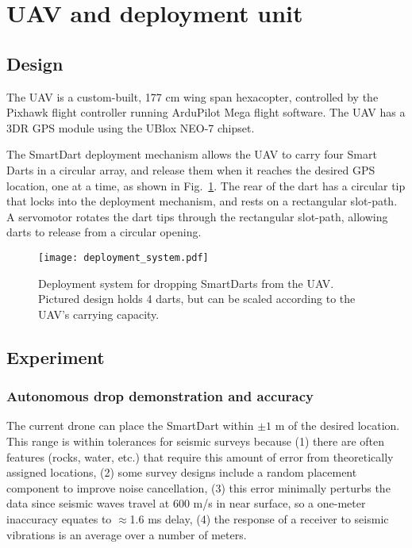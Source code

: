 \section{UAV and deployment unit}\label{sec:DeploymentUnit(UAV)}

\subsection{Design}
The UAV is a custom-built, 177 cm wing span hexacopter, controlled by the Pixhawk flight controller running ArduPilot Mega flight software. The UAV has a 3DR GPS module using the UBlox NEO-7 chipset.


 The SmartDart deployment mechanism allows the UAV to carry four Smart Darts in a circular array, and release them when it reaches the desired GPS location, one at a time, as shown in Fig.~\ref{fig:deployment_system}.
 The rear of the dart has a circular tip that locks into the deployment mechanism, and rests on a rectangular slot-path. 
 A servomotor rotates the dart tips through the rectangular slot-path, allowing darts to release from a circular opening.



\begin{figure} \centering
  {\texttt{[image: deployment\_system.pdf]}}
 \caption{Deployment system for dropping SmartDarts from the UAV. Pictured design holds 4 darts, but can be scaled according to the UAV's carrying capacity.} 
 \label{fig:deployment_system}
\end{figure}



\subsection{Experiment}


\subsubsection{Autonomous drop demonstration and accuracy}

The current drone can place the SmartDart within $\pm1$ m of the desired location.  
This range is within tolerances for seismic surveys because
(1) there are often features (rocks, water, etc.) that require this amount of error from theoretically assigned locations,
(2) some survey designs include a random placement component to improve noise cancellation,
(3) this error minimally perturbs  the data since seismic waves travel at 600 m/s in near surface, so a one-meter inaccuracy equates to $\approx$1.6 ms delay,
(4) the response of a receiver to seismic vibrations is an average over a number of meters.

